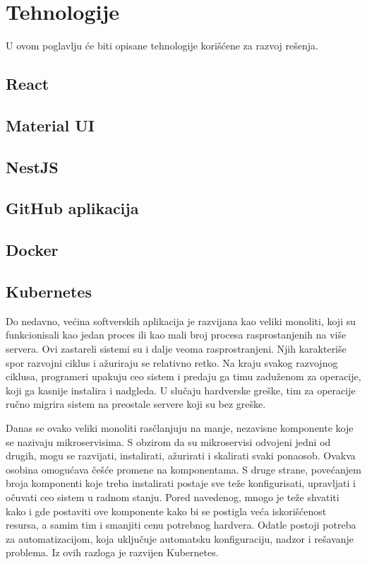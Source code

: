 \chapter{Tehnologije}\label{ch:tehnologije}

U ovom poglavlju će biti opisane tehnologije korišćene za razvoj rešenja.

\section{React}\label{sec:react}

\section{Material UI}\label{sec:material_ui}

\section{NestJS}\label{sec:nestjs}

\section{GitHub aplikacija}\label{sec:github_app}

\section{Docker}\label{sec:docker}

\section{Kubernetes}\label{sec:kubernetes}

Do nedavno, većina softverskih aplikacija je razvijana kao veliki monoliti, koji su funkcionisali kao jedan proces 
ili kao mali broj procesa rasprostanjenih na više servera. Ovi zastareli sistemi su i dalje veoma rasprostranjeni. 
Njih karakteriše spor razvojni ciklus i ažuriraju se relativno retko. Na kraju svakog razvojnog ciklusa, programeri
upakuju ceo sistem i predaju ga timu zaduženom za operacije, koji ga kasnije instalira i nadgleda. U slučaju hardverske
greške, tim za operacije ručno migrira sistem na preostale servere koji su bez greške.

Danas se ovako veliki monoliti rasčlanjuju na manje, nezavisne komponente koje se nazivaju mikroservisima. S obzirom
da su mikroservisi odvojeni jedni od drugih, mogu se razvijati, instalirati, ažurirati i skalirati svaki ponaosob.
Ovakva osobina omogućava češće promene na komponentama. S druge strane, povećanjem broja komponenti koje treba 
instalirati postaje sve teže konfigurisati, upravljati i očuvati ceo sistem u radnom stanju. Pored navedenog, mnogo 
je teže shvatiti kako i gde postaviti ove komponente kako bi se postigla veća iskorišćenost resursa, a samim tim i 
smanjiti cenu potrebnog hardvera. Odatle postoji potreba za automatizacijom, koja uključuje automatsku konfiguraciju,
nadzor  i rešavanje problema. Iz ovih razloga je razvijen Kubernetes.

